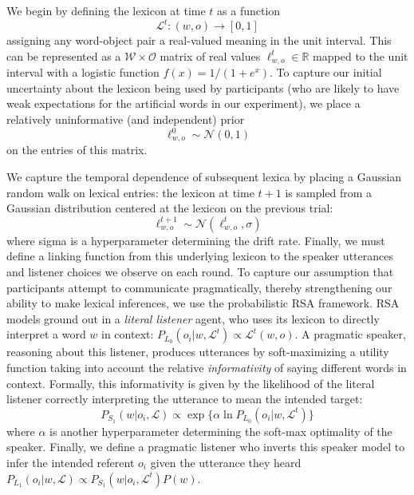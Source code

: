\documentclass[10pt,letterpaper]{article}
\begin{document}
We begin by defining the lexicon at time $t$ as a function 
$$\mathcal{L}^{t} : (w, o) \rightarrow [0,1]$$ 
assigning any word-object pair a real-valued meaning in the unit interval. This can be represented as a $\mathcal{W} \times \mathcal{O}$ matrix of real values $\ell_{w,o}^t \in \mathbb{R}$ mapped to the unit interval with a logistic function $f(x) = 1/(1 + e^{x})$. To capture our initial uncertainty about the lexicon being used by participants (who are likely to have weak expectations for the artificial words in our experiment), we place a relatively uninformative (and independent) prior $$\ell_{w,o}^0 \sim \mathcal{N}(0, 1)$$ on the entries of this matrix. 

We capture the temporal dependence of subsequent lexica by placing a Gaussian random walk on lexical entries: the lexicon at time $t+1$ is sampled from a Gaussian distribution centered at the lexicon on the previous trial: $$\ell_{w,o}^{t+1} \sim \mathcal{N}(\ell_{w,o}^t, \sigma)$$ where sigma is a hyperparameter determining the drift rate. 
Finally, we must define a linking function from this underlying lexicon to the speaker utterances and listener choices we observe on each round. To capture our assumption that participants attempt to communicate pragmatically, thereby strengthening our ability to make lexical inferences, we use the probabilistic RSA framework. RSA models ground out in a \emph{literal listener} agent, who uses its lexicon to directly interpret a word $w$ in context: $P_{L_0}(o_i | w, \mathcal{L}^t) \propto \mathcal{L}^t(w,o)$. A pragmatic speaker, reasoning about this listener, produces utterances by soft-maximizing a utility function taking into account the relative \emph{informativity} of saying different words in context. Formally, this informativity is given by the likelihood of the literal listener correctly interpreting the utterance to mean the intended target: $$P_{S_1}(w | o_i, \mathcal{L}) \propto \exp\{\alpha \ln P_{L_0}(o_i | w, \mathcal{L}^t)\}$$
where $\alpha$ is another hyperparameter determining the soft-max optimality of the speaker. Finally, we define a pragmatic listener who inverts this speaker model to infer the intended referent $o_i$ given the utterance they heard $P_{L_1}(o_i | w, \mathcal{L}) \propto P_{S_1}(w | o_i, \mathcal{L}^t) P(w)$.
\end{document}
